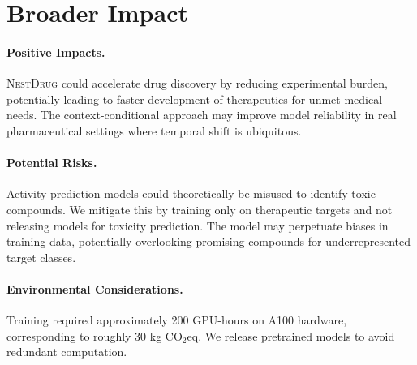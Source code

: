 \documentclass[sigconf]{acmart}
\newcommand{\methodname}{\textsc{NestDrug}}
\begin{document}
\section{Broader Impact}
\label{app:impact}

\paragraph{Positive Impacts.} \methodname{} could accelerate drug discovery by reducing experimental burden, potentially leading to faster development of therapeutics for unmet medical needs. The context-conditional approach may improve model reliability in real pharmaceutical settings where temporal shift is ubiquitous.

\paragraph{Potential Risks.} Activity prediction models could theoretically be misused to identify toxic compounds. We mitigate this by training only on therapeutic targets and not releasing models for toxicity prediction. The model may perpetuate biases in training data, potentially overlooking promising compounds for underrepresented target classes.

\paragraph{Environmental Considerations.} Training required approximately 200 GPU-hours on A100 hardware, corresponding to roughly 30 kg CO$_2$eq. We release pretrained models to avoid redundant computation.
\end{document}
